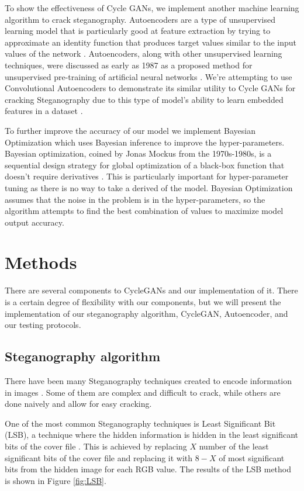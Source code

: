 \documentclass[conference]{IEEEtran}
\begin{document}
To show the effectiveness of Cycle GANs, we implement another machine learning algorithm to crack steganography. Autoencoders are a type of unsupervised learning model that is particularly good at feature extraction by trying to approximate an identity function that produces target values similar to the input values of the network \cite{ng2011sparse}. Autoencoders, along with other unsupervised learning techniques, were discussed as early as 1987 as a proposed method for unsupervised pre-training of artificial neural networks \cite{schmidhuber_deep_2015}. We're attempting to use Convolutional Autoencoders to demonstrate its similar utility to Cycle GANs for cracking Steganography due to this type of model's ability to learn embedded features in a dataset \cite{guo_deep_2017}.

To further improve the accuracy of our model we implement Bayesian Optimization which uses Bayesian inference to improve the hyper-parameters. Bayesian optimization, coined by Jonas Mockus from the 1970s-1980s, is a sequential design strategy for global optimization of a black-box function that doesn't require derivatives \cite{mockus_bayes_1974, mockus_bayes_1975}. This is particularly important for hyper-parameter tuning as there is no way to take a derived of the model. Bayesian Optimization assumes that the noise in the problem is in the hyper-parameters, so the algorithm attempts to find the best combination of values to maximize model output accuracy.


\section{Methods}

There are several components to CycleGANs and our implementation of it. There is a certain degree of flexibility with our components, but we will present the implementation of our steganography algorithm, CycleGAN, Autoencoder, and our testing protocols. 

\subsection{Steganography algorithm}
There have been many Steganography techniques created to encode information in images \cite{johnson_exploring_1998}. Some of them are complex and difficult to crack, while others are done naively and allow for easy cracking. 

One of the most common Steganography techniques is Least Significant Bit (LSB), a technique where the hidden information is hidden in the least significant bits of the cover file \cite{singh2015steganography}. This is achieved by replacing $X$ number of the least significant bits of the cover file and replacing it with $8-X$ of most significant bits from the hidden image for each RGB value. The results of the LSB method is shown in Figure \ref{fig:LSB}.
\end{document}
